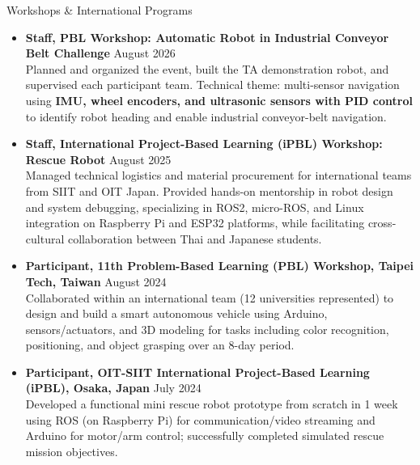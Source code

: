 \documentclass[11pt]{resume} %
\begin{document}
\begin{rSection}{Workshops \& International Programs}
    \begin{itemize}
        \item \textbf{Staff, PBL Workshop: Automatic Robot in Industrial Conveyor Belt Challenge} \hfill { August 2026 }
        \\ Planned and organized the event, built the TA demonstration robot, and supervised each participant team. Technical theme: multi-sensor navigation using \textbf{IMU, wheel encoders, and ultrasonic sensors with PID control} to identify robot heading and enable industrial conveyor-belt navigation.
        \item \textbf{Staff, International Project-Based Learning (iPBL) Workshop: Rescue Robot} \hfill { August 2025 }
        \\ Managed technical logistics and material procurement for international teams from SIIT and OIT Japan. Provided hands-on mentorship in robot design and system debugging, specializing in ROS2, micro-ROS, and Linux integration on Raspberry Pi and ESP32 platforms, while facilitating cross-cultural collaboration between Thai and Japanese students.
        \item \textbf{Participant, 11th Problem-Based Learning (PBL) Workshop, Taipei Tech, Taiwan} \hfill { August 2024 } %
        \\ Collaborated within an international team (12 universities represented) to design and build a smart autonomous vehicle using Arduino, sensors/actuators, and 3D modeling for tasks including color recognition, positioning, and object grasping over an 8-day period.
        \item \textbf{Participant, OIT-SIIT International Project-Based Learning (iPBL), Osaka, Japan} \hfill { July 2024 } %
        \\ Developed a functional mini rescue robot prototype from scratch in 1 week using ROS (on Raspberry Pi) for communication/video streaming and Arduino for motor/arm control; successfully completed simulated rescue mission objectives.
    \end{itemize}
\end{rSection}
\end{document}
